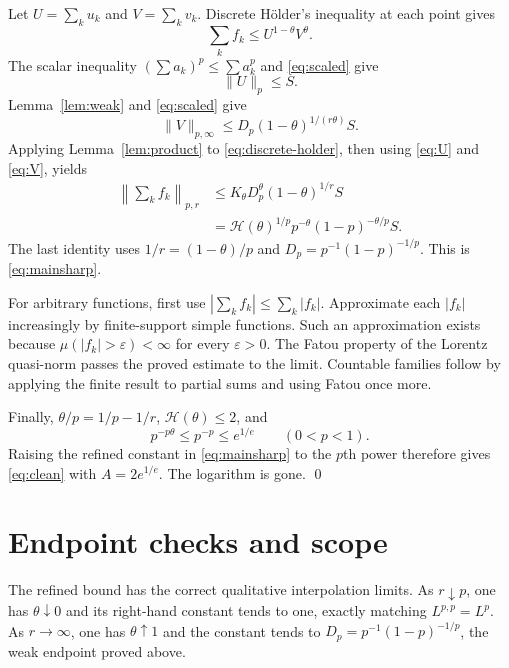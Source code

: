 \documentclass[11pt]{article}
\newcommand{\1}{\mathbf 1}
\begin{document}
Let $U=\sum_k u_k$ and $V=\sum_kv_k$.  Discrete H\"older's inequality at
each point gives
\begin{equation}\label{eq:discrete-holder}
 \sum_k f_k
 \le U^{1-\theta}V^\theta.
\end{equation}
The scalar inequality $(\sum a_k)^p\le\sum a_k^p$ and
\eqref{eq:scaled} give
\begin{equation}\label{eq:U}
 \|U\|_p\le S.
\end{equation}
Lemma~\ref{lem:weak} and \eqref{eq:scaled} give
\begin{equation}\label{eq:V}
 \|V\|_{p,\infty}
 \le D_p(1-\theta)^{1/(r\theta)}S.
\end{equation}
Applying Lemma~\ref{lem:product} to \eqref{eq:discrete-holder}, then using
\eqref{eq:U} and \eqref{eq:V}, yields
\begin{align*}
 \left\|\sum_k f_k\right\|_{p,r}
 &\le K_\theta D_p^\theta(1-\theta)^{1/r}S\\
 &=\mathcal H(\theta)^{1/p}
   p^{-\theta}(1-p)^{-\theta/p}S.
\end{align*}
The last identity uses $1/r=(1-\theta)/p$ and
$D_p=p^{-1}(1-p)^{-1/p}$.  This is \eqref{eq:mainsharp}.

For arbitrary functions, first use
$|\sum_k f_k|\le\sum_k|f_k|$.  Approximate each $|f_k|$ increasingly by
finite-support simple functions.  Such an approximation exists because
$\mu(|f_k|>\varepsilon)<\infty$ for every $\varepsilon>0$.  The Fatou
property of the Lorentz quasi-norm passes the proved estimate to the limit.
Countable families follow by applying the finite result to partial sums and
using Fatou once more.

Finally, $\theta/p=1/p-1/r$, $\mathcal H(\theta)\le2$, and
\[
 p^{-p\theta}\le p^{-p}\le e^{1/e}\qquad(0<p<1).
\]
Raising the refined constant in \eqref{eq:mainsharp} to the $p$th power
therefore gives \eqref{eq:clean} with $A=2e^{1/e}$.  The logarithm is gone.
\qed

\section{Endpoint checks and scope}

The refined bound has the correct qualitative interpolation limits.  As
$r\downarrow p$, one has $\theta\downarrow0$ and its right-hand constant
tends to one, exactly matching $L^{p,p}=L^p$.  As $r\to\infty$, one has
$\theta\uparrow1$ and the constant tends to
$D_p=p^{-1}(1-p)^{-1/p}$, the weak endpoint proved above.
\end{document}
